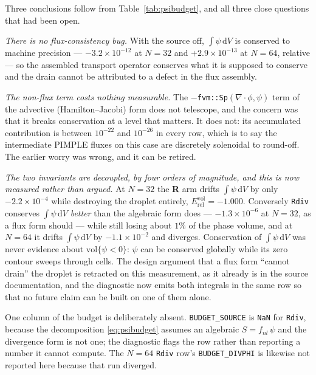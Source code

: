 \documentclass[preprint,3p,11pt]{elsarticle}
\newcommand{\psilev}{\psi}
\begin{document}
Three conclusions follow from Table~\ref{tab:psibudget}, and all three close
questions that had been open.

\emph{There is no flux-consistency bug.} With the source off,
$\int\psilev\,\mathrm dV$ is conserved to machine precision ---
$-3.2\times10^{-12}$ at $N=32$ and $+2.9\times10^{-13}$ at $N=64$, relative ---
so the assembled transport operator conserves what it is supposed to conserve and
the drain cannot be attributed to a defect in the flux assembly.

\emph{The non-flux term costs nothing measurable.} The
$-$\texttt{fvm::Sp}$(\nabla\cdot\phi,\psilev)$ term of the advective
(Hamilton--Jacobi) form does not telescope, and the concern was that it breaks
conservation at a level that matters. It does not: its accumulated contribution
is between $10^{-22}$ and $10^{-26}$ in every row, which is to say the
intermediate PIMPLE fluxes on this case are discretely solenoidal to round-off.
The earlier worry was wrong, and it can be retired.

\emph{The two invariants are decoupled, by four orders of magnitude, and this is
now measured rather than argued.} At $N=32$ the \textbf{R} arm drifts
$\int\psilev\,\mathrm dV$ by only $-2.2\times10^{-4}$ while destroying the
droplet entirely, $E^{\mathrm{vol}}_{\mathrm{rel}} = -1.000$. Conversely
\texttt{Rdiv} conserves $\int\psilev\,\mathrm dV$ \emph{better} than the
algebraic form does --- $-1.3\times10^{-6}$ at $N=32$, as a flux form should ---
while still losing about $1\%$ of the phase volume, and at $N=64$ it drifts
$\int\psilev\,\mathrm dV$ by $-1.1\times10^{-2}$ and diverges. Conservation of
$\int\psilev\,\mathrm dV$ was never evidence about $\mathrm{vol}\{\psilev<0\}$:
$\psilev$ can be conserved globally while its zero contour sweeps through cells.
The design argument that a flux form ``cannot drain'' the droplet is retracted on
this measurement, as it already is in the source documentation, and the
diagnostic now emits both integrals in the same row so that no future claim can
be built on one of them alone.

One column of the budget is deliberately absent. \texttt{BUDGET\_SOURCE} is
\texttt{NaN} for \texttt{Rdiv}, because the decomposition \eqref{eq:psibudget}
assumes an algebraic $S = f_{nl}\,\psilev$ and the divergence form is not one; the
diagnostic flags the row rather than reporting a number it cannot compute. The
$N=64$ \texttt{Rdiv} row's \texttt{BUDGET\_DIVPHI} is likewise not reported here
because that run diverged.
\end{document}
